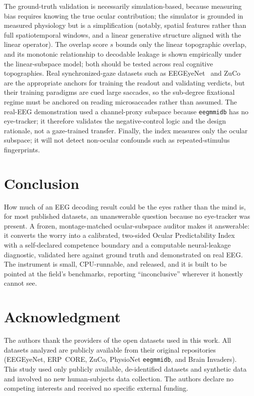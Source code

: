 \documentclass[conference]{IEEEtran}
\begin{document}
The ground-truth validation is necessarily simulation-based, because measuring bias requires
knowing the true ocular contribution; the simulator is grounded in measured physiology but is a
simplification (notably, spatial features rather than full spatiotemporal windows, and a linear
generative structure aligned with the linear operator). The overlap score $s$ bounds only the linear topographic overlap, and its monotonic relationship
to decodable leakage is shown empirically under the linear-subspace model; both should be tested
across real cognitive topographies. Real synchronized-gaze datasets
such as EEGEyeNet~\cite{kastrati2021eegeyenet} and ZuCo~\cite{hollenstein2018zuco,hollenstein2020zuco2}
are the appropriate anchors for training the readout and validating verdicts, but their training
paradigms are cued large saccades, so the sub-degree fixational regime must be anchored on
reading microsaccades rather than assumed. The real-EEG demonstration used a channel-proxy
subspace because \texttt{eegmmidb} has no eye-tracker; it therefore validates the negative-control
logic and the design rationale, not a gaze-trained transfer. Finally, the index measures only the
ocular subspace; it will not detect non-ocular confounds such as repeated-stimulus fingerprints.

\section{Conclusion}

How much of an EEG decoding result could be the eyes rather than the mind is, for most published
datasets, an unanswerable question because no eye-tracker was present. A frozen, montage-matched
ocular-subspace auditor makes it answerable: it converts the worry into a calibrated, two-sided
Ocular Predictability Index with a self-declared competence boundary and a computable
neural-leakage diagnostic, validated here against ground truth and demonstrated on real EEG. The
instrument is small, CPU-runnable, and released, and it is built to be pointed at the field's
benchmarks, reporting ``inconclusive'' wherever it honestly cannot see.

\section*{Acknowledgment}

The authors thank the providers of the open datasets used in this work. All datasets analyzed are
publicly available from their original repositories (EEGEyeNet, ERP~CORE, ZuCo, PhysioNet
\texttt{eegmmidb}, and Brain Invaders). This study used only publicly available,
de-identified datasets and synthetic data and involved no new human-subjects data collection. The
authors declare no competing interests and received no specific external funding.
\end{document}
